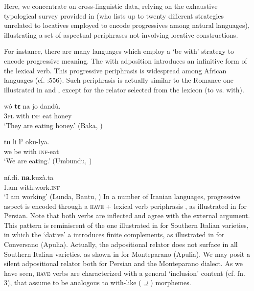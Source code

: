 \documentclass[output=paper,modfonts,nonflat,newtxmath,colorlinks,citecolor=brown]{langsci/langscibook}
\begin{document}
Here, we concentrate on cross-linguistic data, relying on the exhaustive typological survey provided in \citet{Cinque2017} (who lists up to twenty different strategies unrelated to locatives employed to encode progressives among natural languages), illustrating a set of aspectual periphrases not involving locative constructions. 

For instance, there are many languages which employ a ‘be with’ strategy to encode progressive meaning. The {with} adposition introduces an infinitive form of the lexical verb. This progressive periphrasis is widespread among African languages (cf. \citealt{Cinque2017}:556). Such periphrasis is actually similar to the Romance one illustrated in  and , except for the relator selected from the lexicon ({to} vs. {with}).

\ea%
    \label{ex:franco:12}
    \gll wó  \textbf{tε}   na   jo   dandù.\\
        3\textsc{pl}  with   \textsc{inf}   eat   honey\\
    \glt ‘They are eating honey.’   (Baka, \citealt[29]{Kilian-Hatz1992})
    \z

\ea%
    \label{ex:franco:13}
    \gll tu   li   \textbf{l’}   oku-lya. \\
        we  be  with  \textsc{inf}-eat\\
    \glt ‘We are eating.’  (Umbundu, \citealt[83]{HeineKuteva2002})
    \z

\ea%
    \label{ex:franco:14}
    \gll ní.dí.   \textbf{na}.kuzà.ta\\
        I.am  with.work.\textsc{inf}  \\
    \glt ‘I am working’    (Lunda, Bantu, \citealt[194]{Kawasha2003})
    \z
In a number of Iranian languages, progressive aspect is encoded through a \textsc{have} + lexical verb periphrasis \citep[556]{Cinque2017}, as illustrated in  for Persian. Note that both verbs are inflected and agree with the external argument. This pattern is reminiscent of the one illustrated in \citet{ManziniEtAl2017} for Southern Italian varieties, in which the ‘dative’ {a} introduces finite complements, as illustrated in  for Conversano (Apulia). Actually, the adpositional relator does not surface in all Southern Italian varieties, as shown in  for Monteparano (Apulia). We may posit a silent adpositional relator \citep{Kayne2003} both for Persian and the Monteparano dialect. As we have seen, \textsc{have} verbs are characterized with a general ‘inclusion’ content (cf. fn. 3), that \citet{ManziniFranco2016} assume to be analogous to {with}{}-like (${\supseteq}$) morphemes.
\end{document}
